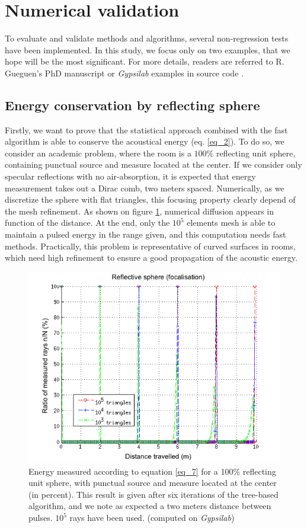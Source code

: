 \documentclass{aes2e}
\begin{document}
\section{Numerical validation}
To evaluate and validate methods and algorithms, several non-regression tests have been implemented. In this study, we focus only on two examples, that we hope will be the most significant. For more details, readers are referred to R. Gueguen's PhD manuscript \cite{theseRobin} or \textit{Gypsilab} examples in source code \cite{githubGypsi}.   

\subsection{Energy conservation by reflecting sphere}
Firstly, we want to prove that the statistical approach combined with the fast algorithm is able to conserve the acoustical energy (eq. \ref{eq_2}). To do so, we consider an academic problem, where the room is a $100\%$ reflecting unit sphere, containing punctual source and measure located at the center. If we consider only specular reflections with no air-absorption, it is expected that energy measurement takes out a Dirac comb, two meters spaced.
Numerically, as we discretize the sphere with flat triangles, this focusing property clearly depend of the mesh refinement. As shown on figure \ref{test2RIR}, numerical diffusion appears in function of the distance.  At the end, only the $10^5$ elements mesh is able to maintain a pulsed energy in the range given, and this computation needs fast methods. Practically, this problem is representative of curved surfaces in rooms, which need high refinement to ensure a good propagation of the acoustic energy.

\begin{figure}[t]
\centering
		\includegraphics[width=\linewidth]{sphere}
		\caption{Energy measured according to equation \ref{eq_7} for a 100\% reflecting unit sphere, with punctual source and measure located at the center (in percent). This result is given after six iterations of the tree-based algorithm, and we note as expected a two meters distance between pulses. $10^5$ rays have been used. (computed on \textit{Gypsilab})}
		\label{test2RIR}
\end{figure}
\end{document}
